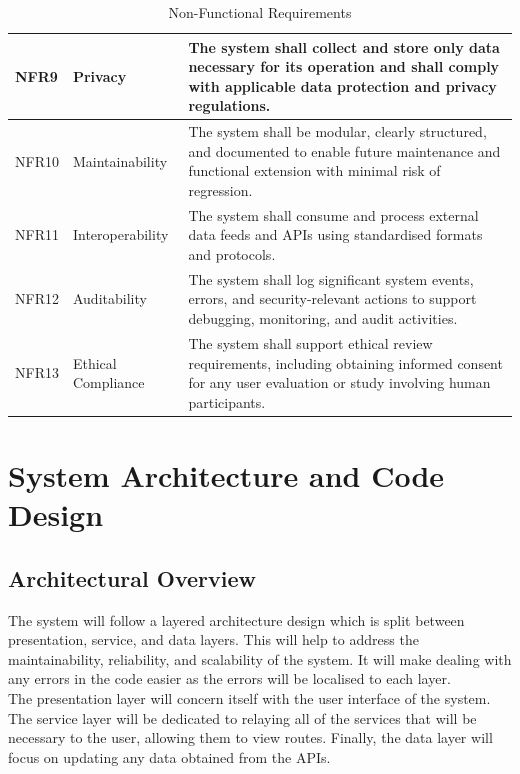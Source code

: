 \documentclass{article}
\begin{document}
\begin{table}[H]
\begin{tabular}{|p{1cm}|p{3cm}|p{13cm}|}
\hline
NFR9 & Privacy &
The system shall collect and store only data necessary for its operation and shall comply with applicable data protection and privacy regulations. \\
\hline
NFR10 & Maintainability &
The system shall be modular, clearly structured, and documented to enable future maintenance and functional extension with minimal risk of regression. \\
\hline
NFR11 & Interoperability &
The system shall consume and process external data feeds and APIs using standardised formats and protocols. \\
\hline
NFR12 & Auditability &
The system shall log significant system events, errors, and security-relevant actions to support debugging, monitoring, and audit activities. \\
\hline
NFR13 & Ethical Compliance &
The system shall support ethical review requirements, including obtaining informed consent for any user evaluation or study involving human participants. \\
\hline
\end{tabular}
\caption{Non-Functional Requirements}
\end{table}



\section{System Architecture and Code Design}

\subsection{Architectural Overview}
The system will follow a layered architecture design which is split between presentation, service, and data layers. This will help to address the maintainability, reliability, and scalability of the system. It will make dealing with any errors in the code easier as the errors will be localised to each layer. \\

The presentation layer will concern itself with the user interface of the system. The service layer will be dedicated to relaying all of the services that will be necessary to the user, allowing them to view routes. Finally, the data layer will focus on updating any data obtained from the APIs. \\
\end{document}
